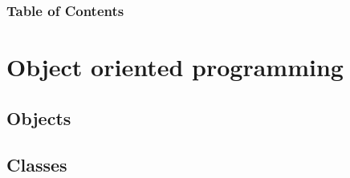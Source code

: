 \documentclass{beamer}
\subtitle{Session 1: Basics}
\begin{document}
\frame{\titlepage}

\begin{frame}
\frametitle{Table of Contents}
\tableofcontents
\end{frame}


\section{Object oriented programming}

\subsection{Objects}


\subsection{Classes}

\end{document}
